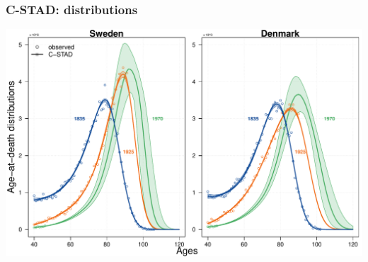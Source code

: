 \documentclass[12pt, xcolor=table]{beamer}  %
\begin{document}
\begin{frame}[noframenumbering]\frametitle{C-STAD: distributions}
	
	\vspace{-0.5cm}
	
	
	\begin{center}	
		\vspace{0.2cm}
		
		\includegraphics[scale=.42]{Figures/Ch4/F8}
		
	\end{center}
	
\end{frame}
\end{document}
